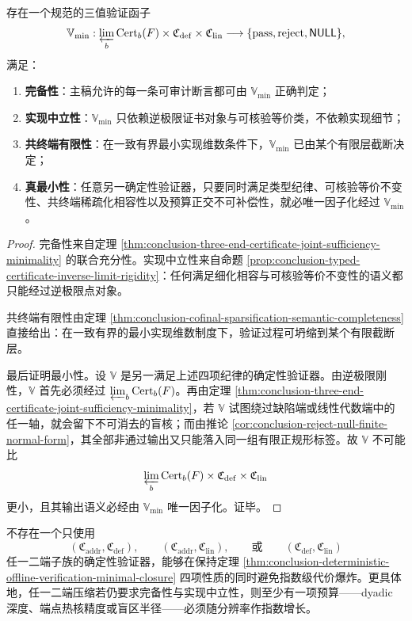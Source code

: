 \begin{theorem}[确定性离线验证的最小闭包]\label{thm:conclusion-deterministic-offline-verification-minimal-closure}
存在一个规范的三值验证函子
\[
\mathbb V_{\min}:
\varprojlim_b \mathrm{Cert}_b(F)\times \mathfrak C_{\mathrm{def}}\times \mathfrak C_{\mathrm{lin}}
\longrightarrow
\{\mathrm{pass},\mathrm{reject},\mathsf{NULL}\},
\]
满足：
\begin{enumerate}
  \item \textbf{完备性}：主稿允许的每一条可审计断言都可由 \(\mathbb V_{\min}\) 正确判定；
  \item \textbf{实现中立性}：\(\mathbb V_{\min}\) 只依赖逆极限证书对象与可核验等价类，不依赖实现细节；
  \item \textbf{共终端有限性}：在一致有界最小实现维数条件下，\(\mathbb V_{\min}\) 已由某个有限层截断决定；
  \item \textbf{真最小性}：任意另一确定性验证器，只要同时满足类型纪律、可核验等价不变性、共终端稀疏化相容性以及预算正交不可补偿性，就必唯一因子化经过 \(\mathbb V_{\min}\)。
\end{enumerate}
\end{theorem}
\begin{proof}
完备性来自定理 \ref{thm:conclusion-three-end-certificate-joint-sufficiency-minimality} 的联合充分性。实现中立性来自命题 \ref{prop:conclusion-typed-certificate-inverse-limit-rigidity}：任何满足细化相容与可核验等价不变性的语义都只能经过逆极限点对象。

共终端有限性由定理 \ref{thm:conclusion-cofinal-sparsification-semantic-completeness} 直接给出：在一致有界的最小实现维数制度下，验证过程可坍缩到某个有限截断层。

最后证明最小性。设 \(\mathbb V\) 是另一满足上述四项纪律的确定性验证器。由逆极限刚性，\(\mathbb V\) 首先必须经过 \(\varprojlim_b \mathrm{Cert}_b(F)\)。再由定理 \ref{thm:conclusion-three-end-certificate-joint-sufficiency-minimality}，若 \(\mathbb V\) 试图绕过缺陷端或线性代数端中的任一轴，就会留下不可消去的盲核；而由推论 \ref{cor:conclusion-reject-null-finite-normal-form}，其全部非通过输出又只能落入同一组有限正规形标签。故 \(\mathbb V\) 不可能比
\[
\varprojlim_b \mathrm{Cert}_b(F)\times \mathfrak C_{\mathrm{def}}\times \mathfrak C_{\mathrm{lin}}
\]
更小，且其输出语义必经由 \(\mathbb V_{\min}\) 唯一因子化。证毕。
\end{proof}

\begin{conjecture}[二端压缩的指数罚则]\label{conj:conclusion-two-end-compression-exponential-penalty}
不存在一个只使用
\[
(\mathfrak C_{\mathrm{addr}},\mathfrak C_{\mathrm{def}}),
\qquad
(\mathfrak C_{\mathrm{addr}},\mathfrak C_{\mathrm{lin}}),
\qquad
\text{或}
\qquad
(\mathfrak C_{\mathrm{def}},\mathfrak C_{\mathrm{lin}})
\]
任一二端子族的确定性验证器，能够在保持定理 \ref{thm:conclusion-deterministic-offline-verification-minimal-closure} 四项性质的同时避免指数级代价爆炸。更具体地，任一二端压缩若仍要求完备性与实现中立性，则至少有一项预算——dyadic 深度、端点热核精度或盲区半径——必须随分辨率作指数增长。
\end{conjecture}
